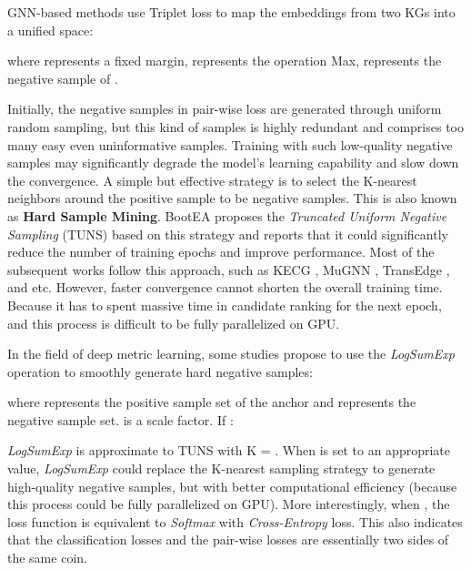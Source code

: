 \documentclass[sigconf]{acmart}
\begin{document}
GNN-based methods use Triplet loss to map the embeddings from two KGs into a unified space:

where  represents a fixed margin,  represents the operation Max,  represents the negative sample of .

Initially, the negative samples in pair-wise loss are generated through uniform random sampling, but this kind of samples is highly redundant and comprises too many easy even uninformative samples.
Training with such low-quality negative samples may significantly degrade the model's learning capability and slow down the convergence.
A simple but effective strategy is to select the K-nearest neighbors around the positive sample to be negative samples.
This is also known as \textbf{Hard Sample Mining}.
BootEA proposes the \emph{Truncated Uniform Negative Sampling} (TUNS) based on this strategy and reports that it could significantly reduce the number of training epochs and improve performance.
Most of the subsequent works follow this approach, such as KECG \cite{DBLP:conf/emnlp/LiCHSLC19}, MuGNN \cite{DBLP:conf/acl/CaoLLLLC19}, TransEdge \cite{DBLP:conf/semweb/SunHL17}, and etc.
However, faster convergence cannot shorten the overall training time.
Because it has to spent massive time in candidate ranking for the next epoch, and this process is difficult to be fully parallelized on GPU.


In the field of deep metric learning, some studies \cite{DBLP:conf/cvpr/SunCZZZWW20,DBLP:conf/cvpr/SongXJS16} propose to use the \emph{LogSumExp} operation to smoothly generate hard negative samples:

where  represents the positive sample set of the anchor and  represents the negative sample set.
 is a scale factor.
If :



\emph{LogSumExp} is approximate to TUNS with K = .
When  is set to an appropriate value, \emph{LogSumExp} could replace the K-nearest sampling strategy to generate high-quality negative samples, but with better computational efficiency (because this process could be fully parallelized on GPU).
More interestingly, when , the loss function is equivalent to \emph{Softmax} with \emph{Cross-Entropy} loss.
This also indicates that the classification losses and the pair-wise losses are essentially two sides of the same coin.
\end{document}
